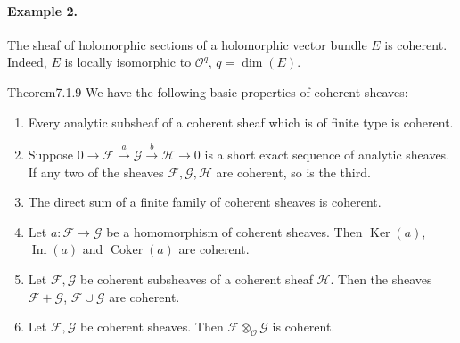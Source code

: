 \paragraph{Example 2.} The sheaf of holomorphic sections of a holomorphic vector bundle $E$ is coherent. Indeed, $\underline E$ is locally isomorphic to $\mathcal{O}^q$, $q=\dim(E)$.
\begin{originaltheorem}{Theorem}{7.1.9}
We have the following basic properties of coherent sheaves:
\begin{enumerate}[label=\arabic*.]
\item Every analytic subsheaf of a coherent sheaf which is of finite type is coherent.
\item Suppose $0\to\mathcal{F}\xrightarrow{a}\mathcal{G}\xrightarrow{b}\mathcal{H}\to0$ is a short exact sequence of analytic sheaves. If any two of the sheaves $\mathcal{F},\mathcal{G},\mathcal{H}$ are coherent, so is the third.
\item The direct sum of a finite family of coherent sheaves is coherent.
\item Let $a:\mathcal{F}\to\mathcal{G}$ be a homomorphism of coherent sheaves. Then $\operatorname{Ker}(a)$, $\operatorname{Im}(a)$ and $\operatorname{Coker}(a)$ are coherent.
\item Let $\mathcal{F},\mathcal{G}$ be coherent subsheaves of a coherent sheaf $\mathcal{H}$. Then the sheaves $\mathcal{F}+\mathcal{G}$, $\mathcal{F}\cup\mathcal{G}$ are coherent.

\item Let $\mathcal{F},\mathcal{G}$ be coherent sheaves. Then $\mathcal{F}\otimes_{\mathcal{O}}\mathcal{G}$ is coherent.
\end{enumerate}
\end{originaltheorem}
